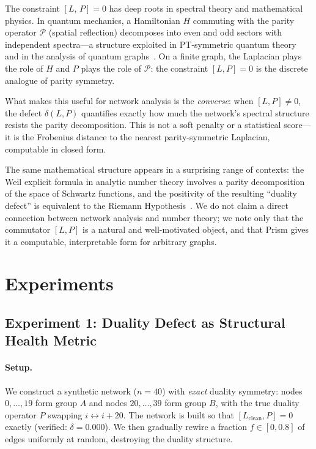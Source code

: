\documentclass[11pt]{article}
\newcommand{\comm}[2]{[#1,\,#2]}
\begin{document}
The constraint $\comm{L}{P} = 0$ has deep roots in spectral theory and
mathematical physics.
In quantum mechanics, a Hamiltonian $H$ commuting with the parity
operator $\mathcal{P}$ (spatial reflection) decomposes into even and odd
sectors with independent spectra---a structure exploited in PT-symmetric
quantum theory~\cite{Bender1998} and in the analysis of quantum
graphs~\cite{Berkolaiko2013}.
On a finite graph, the Laplacian plays the role of $H$ and $P$ plays
the role of $\mathcal{P}$: the constraint $[L, P] = 0$ is the discrete
analogue of parity symmetry.

What makes this useful for network analysis is the \emph{converse}:
when $[L, P] \neq 0$, the defect $\delta(L, P)$ quantifies exactly how
much the network's spectral structure resists the parity decomposition.
This is not a soft penalty or a statistical score---it is the Frobenius
distance to the nearest parity-symmetric Laplacian, computable in
closed form.

The same mathematical structure appears in a surprising range of
contexts: the Weil explicit formula in analytic number theory involves
a parity decomposition of the space of Schwartz functions, and the
positivity of the resulting ``duality defect'' is equivalent to the
Riemann Hypothesis~\cite{Connes1999}.
We do not claim a direct connection between network analysis and number
theory; we note only that the commutator $[L, P]$ is a natural and
well-motivated object, and that Prism gives it a computable,
interpretable form for arbitrary graphs.

\section{Experiments}
\label{sec:experiments}

\subsection{Experiment 1: Duality Defect as Structural Health Metric}

\paragraph{Setup.}
We construct a synthetic network ($n = 40$) with \emph{exact} duality
symmetry: nodes $0, \ldots, 19$ form group $A$ and nodes $20, \ldots, 39$
form group $B$, with the true duality operator $P$ swapping $i \leftrightarrow i+20$.
The network is built so that $[L_{\text{clean}}, P] = 0$ exactly
(verified: $\delta = 0.000$).
We then gradually rewire a fraction $f \in [0, 0.8]$ of edges uniformly
at random, destroying the duality structure.
\end{document}
